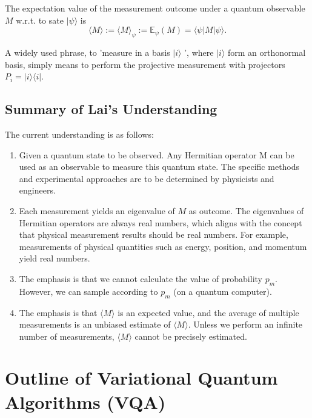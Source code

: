 \documentclass[
        11pt, %
	a4paper, %
]{LegrandOrangeBook}
\begin{document}
\begin{definition}
    The expectation value of the measurement outcome under a quantum observable $M$ w.r.t. to sate $|\psi\rangle$ is
\begin{equation}
    \langle M \rangle:=\langle M \rangle_{\psi}:= \mathbb{E}_\psi(M)=\langle\psi|M| \psi\rangle.
\end{equation}
\end{definition}

\begin{remark}
    A widely used phrase, to 'measure in a basis $|i\rangle$ ', where $|i\rangle$ form an orthonormal basis, simply means to perform the projective measurement with projectors $P_i=|i\rangle\langle i|$.
\end{remark}

\subsection{Summary of Lai's Understanding}

The current understanding is as follows: %
\begin{enumerate}
    \item Given a quantum state to be observed. Any Hermitian operator M can be used as an observable to measure this quantum state. The specific methods and experimental approaches are to be determined by physicists and engineers.
    \item Each measurement yields an eigenvalue of $M$ as outcome. The eigenvalues of Hermitian operators are always real numbers, which aligns with the concept that physical measurement results should be real numbers. For example, measurements of physical quantities such as energy, position, and momentum yield real numbers.
    \item The emphasis is that we cannot calculate the value of probability $p_m$. However, we can sample according to $p_m$ (on a quantum computer).
    \item The emphasis is that $\langle M \rangle$ is an expected value, and the average of multiple measurements is an unbiased estimate of $\langle M \rangle$. Unless we perform an infinite number of measurements, $\langle M \rangle$ cannot be precisely estimated.
\end{enumerate}

\section{Outline of Variational Quantum Algorithms (VQA) \cite{ding2023random,cerezo2021variational}}
\end{document}
